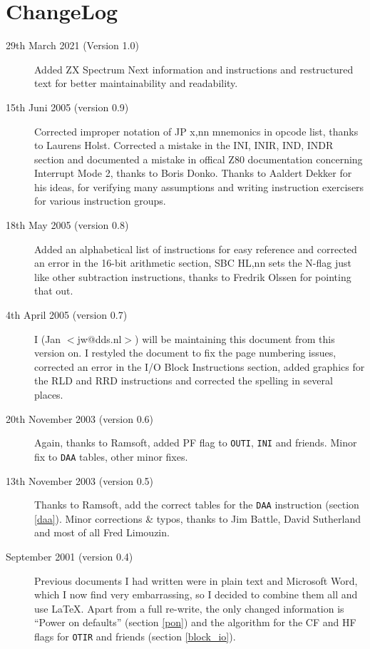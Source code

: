 \documentclass[12pt,twoside,openright,a4paper]{book}
\begin{document}
\section{ChangeLog}
\begin{description}

\item[29th March 2021 (Version 1.0)]
Added ZX Spectrum Next information and instructions and restructured text for better maintainability and readability.

\item[15th Juni 2005 (version 0.9)]
Corrected improper notation of JP x,nn mnemonics in opcode list, thanks to
Laurens Holst. Corrected a mistake in the INI, INIR, IND, INDR section 
and documented a mistake in offical Z80 documentation concerning Interrupt 
Mode 2, thanks to Boris Donko. Thanks to Aaldert Dekker for his ideas, for 
verifying many assumptions and writing instruction exercisers for various 
instruction groups.

\item[18th May 2005 (version 0.8)]
Added an alphabetical list of instructions for easy reference and corrected an 
error in the 16-bit arithmetic section, SBC HL,nn sets the N-flag just like
other subtraction instructions, thanks to Fredrik Olssen for pointing that out.

\item[4th April 2005 (version 0.7)]
I (Jan $<$jw@dds.nl$>$) will be maintaining this document from this version on.
I restyled the document to fix the page numbering issues, 
corrected an error in the I/O Block Instructions section, added 
graphics for the RLD and RRD instructions and corrected the spelling in several places.

\item[20th November 2003 (version 0.6)]
Again, thanks to Ramsoft, added PF flag to {\tt OUTI}, {\tt INI} and
friends. Minor fix to {\tt DAA} tables, other minor fixes.

\item[13th November 2003 (version 0.5)]
Thanks to Ramsoft, add the correct tables for the {\tt DAA} instruction
(section \ref{daa}). Minor corrections \& typos, thanks to Jim Battle,
David Sutherland and most of all Fred Limouzin.

\item[September 2001 (version 0.4)]
Previous documents I had written were in plain text and Microsoft
Word, which I now find very embarrassing, so I decided to combine them all 
and use {\LaTeX}. Apart from a full re-write, the only changed information is
``Power on defaults'' (section \ref{pon}) and the algorithm for the CF 
and HF flags for {\tt OTIR} and friends (section \ref{block_io}).

\end{description}
\end{document}
